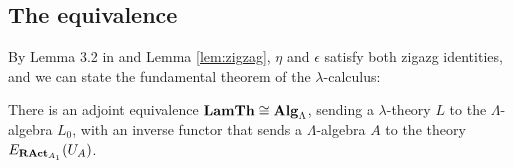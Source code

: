 \subsection{The equivalence}

By Lemma 3.2 in \autocite{nlab:adjoint_equivalence} and Lemma \ref{lem:zigzag}, $ \eta $ and $ \epsilon $ satisfy both zigazg identities, and we can state the fundamental theorem of the $ \lambda $-calculus:
\begin{theorem}\label{thm:Hyland-fundamental-theorem}
  There is an adjoint equivalence $ \mathbf{LamTh} \cong \mathbf{Alg}_{\Lambda} $, sending a $ \lambda $-theory $ L $ to the $ \Lambda $-algebra $ L_0 $, with an inverse functor that sends a $ \Lambda $-algebra $ A $ to the theory $ E_{\mathbf{RAct}_{A_1}}(U_A) $.
\end{theorem}

